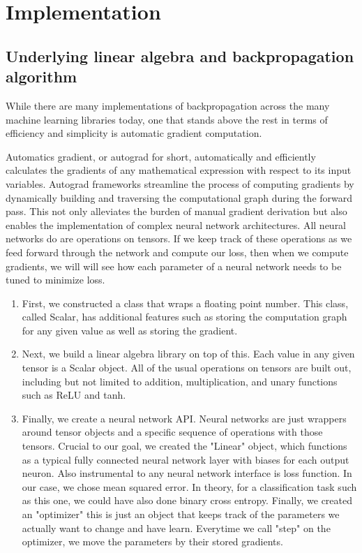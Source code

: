 \documentclass[letterpaper, 12pt]{article}
\begin{document}
\section{Implementation}

\subsection{Underlying linear algebra and backpropagation algorithm}
While there are many implementations of backpropagation across the many machine learning libraries today, one that stands above the rest in terms of efficiency and simplicity is automatic gradient computation.

Automatics gradient, or autograd for short, automatically and efficiently calculates the gradients of any mathematical expression with respect to its input variables. Autograd frameworks streamline the process of computing gradients by dynamically building and traversing the computational graph during the forward pass. This not only alleviates the burden of manual gradient derivation but also enables the implementation of complex neural network architectures. All neural networks do are operations on tensors. If we keep track of these operations as we feed forward through the network and compute our loss, then when we compute gradients, we will will see how each parameter of a neural network needs to be tuned to minimize loss.

\begin{enumerate}
\item  First, we constructed a class that wraps a floating point number. This class, called Scalar, has additional features such as storing the computation graph for any given value as well as storing the gradient.
\item Next, we build a linear algebra library on top of this. Each value in any given tensor is a Scalar object. All of the usual operations on tensors are built out, including but not limited to addition, multiplication, and unary functions such as ReLU and tanh.
\item Finally, we create a neural network API. Neural networks are just wrappers around tensor objects and a specific sequence of operations with those tensors. Crucial to our goal, we created the "Linear" object, which functions as a typical fully connected neural network layer with biases for each output neuron. Also instrumental to any neural network interface is loss function. In our case, we chose mean squared error. In theory, for a classification task such as this one, we could have also done binary cross entropy. Finally, we created an "optimizer" this is just an object that keeps track of the parameters we actually want to change and have learn. Everytime we call "step" on the optimizer, we move the parameters by their stored gradients.
\end{enumerate}
\end{document}
